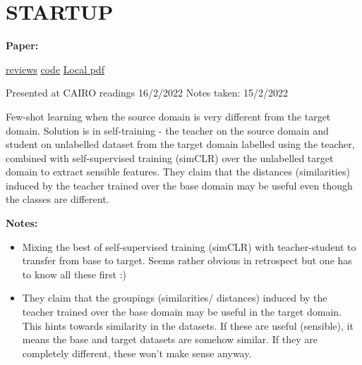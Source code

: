 \clearpage

\section{STARTUP}\label{sec:startup}

\begin{notebox}
\textbf{Paper: } 
\vspace{5pt}

\href{https://openreview.net/forum?id=O3Y56aqpChA}{reviews}
\hspace{1cm}
\href{https://github.com/cpphoo/STARTUP}{code}
\hspace{1cm}
\href{run:/home/magda/Dropbox/Zot/Phoo_Hariharan_2021_Self-training for Few-shot Transfer Across Extreme Task Differences}{Local pdf}
\vspace{3pt}

Presented at CAIRO readings 16/2/2022
\hfill Notes taken: 15/2/2022 
\end{notebox}

\begin{notebox}[colback=red!5]
\tldr Few-shot learning when the source domain is very different from the target domain. Solution is in self-training - the teacher on the source domain and student on unlabelled dataset from the target domain labelled using the teacher, combined with self-supervised training (simCLR) over the unlabelled target domain to extract sensible features. They claim that the distances (similarities) induced by the teacher trained over the base domain may be useful even though the classes are different.
\end{notebox}

\begin{notebox}[colback=yellow!5]
\textbf{Notes:} 
\begin{itemize}[nosep]
\item Mixing the best of self-supervised training (simCLR) with teacher-student to transfer from base to target. Seems rather obvious in retrospect but one has to know all these first :)
\item They claim that the groupings (similarities/ distances) induced by the teacher trained over the base domain may be useful in the target domain. This hints towards similarity in the datasets. If these are useful (sensible), it means the base and target datasets are somehow similar. If they are completely different, these won't make sense anyway.
\end{itemize}
\end{notebox}


